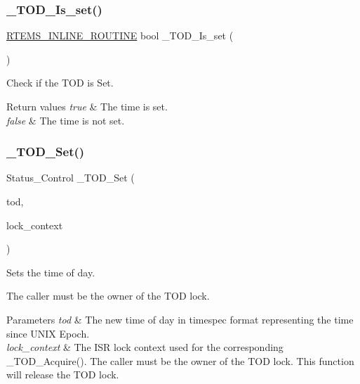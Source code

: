 \subsubsection{\texorpdfstring{\_TOD\_Is\_set()}{\_TOD\_Is\_set()}}
{\footnotesize\ttfamily \mbox{\hyperlink{group__RTEMSScoreBaseDefs_gac216239df231d5dbd15e3520b0b9313f}{R\+T\+E\+M\+S\+\_\+\+I\+N\+L\+I\+N\+E\+\_\+\+R\+O\+U\+T\+I\+NE}} bool \+\_\+\+T\+O\+D\+\_\+\+Is\+\_\+set (\begin{DoxyParamCaption}\item[{void}]{ }\end{DoxyParamCaption})}



Check if the T\+OD is Set. 


\begin{DoxyRetVals}{Return values}
{\em true} & The time is set. \\
\hline
{\em false} & The time is not set. \\
\hline
\end{DoxyRetVals}
\mbox{\label{group__RTEMSScoreTOD_ga1c22915a212fe0e27a891dfc57d4bfcb}} 
\subsubsection{\texorpdfstring{\_TOD\_Set()}{\_TOD\_Set()}}
{\footnotesize\ttfamily Status\+\_\+\+Control \+\_\+\+T\+O\+D\+\_\+\+Set (\begin{DoxyParamCaption}\item[{const struct timespec $\ast$}]{tod,  }\item[{\mbox{\hyperlink{structISR__lock__Context}{I\+S\+R\+\_\+lock\+\_\+\+Context}} $\ast$}]{lock\+\_\+context }\end{DoxyParamCaption})}



Sets the time of day. 

The caller must be the owner of the T\+OD lock.


\begin{DoxyParams}{Parameters}
{\em tod} & The new time of day in timespec format representing the time since U\+N\+IX Epoch. \\
\hline
{\em lock\+\_\+context} & The I\+SR lock context used for the corresponding \+\_\+\+T\+O\+D\+\_\+\+Acquire(). The caller must be the owner of the T\+OD lock. This function will release the T\+OD lock.\\
\hline
\end{DoxyParams}

